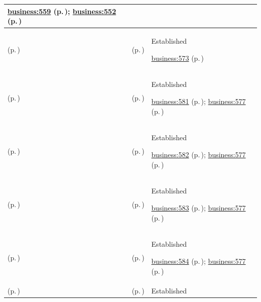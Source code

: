 \begin{longtable}{|>{\raggedright\arraybackslash}p{0.27\TableWidth}|>{\raggedright\arraybackslash}p{0.27\TableWidth}|>{\raggedright\arraybackslash}p{0.46\TableWidth}|}
 \hyperref[rad:business:554]{business:559} (p.\,\pageref{rad:business:554}); \hyperref[rad:business:552]{business:552} (p.\,\pageref{rad:business:552})\\\hline
\nameref{cap:bc-community-health-wellbeing} (p.\,\pageref{cap:bc-community-health-wellbeing}) & \nameref{cap:bc-preventative-health} (p.\,\pageref{cap:bc-preventative-health}) & Established

 \hyperref[rad:business:573]{business:573} (p.\,\pageref{rad:business:573})\\\hline
\nameref{cap:bc-preventative-health} (p.\,\pageref{cap:bc-preventative-health}) & \nameref{cap:bc-preventative-health-problem-identification} (p.\,\pageref{cap:bc-preventative-health-problem-identification}) & Established

 \hyperref[rad:business:579]{business:581} (p.\,\pageref{rad:business:579}); \hyperref[rad:business:577]{business:577} (p.\,\pageref{rad:business:577})\\\hline
\nameref{cap:bc-preventative-health} (p.\,\pageref{cap:bc-preventative-health}) & \nameref{cap:bc-preventative-health-programme-management} (p.\,\pageref{cap:bc-preventative-health-programme-management}) & Established

 \hyperref[rad:business:579]{business:582} (p.\,\pageref{rad:business:579}); \hyperref[rad:business:577]{business:577} (p.\,\pageref{rad:business:577})\\\hline
\nameref{cap:bc-preventative-health} (p.\,\pageref{cap:bc-preventative-health}) & \nameref{cap:bc-preventative-health-education-services} (p.\,\pageref{cap:bc-preventative-health-education-services}) & Established

 \hyperref[rad:business:579]{business:583} (p.\,\pageref{rad:business:579}); \hyperref[rad:business:577]{business:577} (p.\,\pageref{rad:business:577})\\\hline
\nameref{cap:bc-preventative-health} (p.\,\pageref{cap:bc-preventative-health}) & \nameref{cap:bc-preventative-health-programme-monitoring} (p.\,\pageref{cap:bc-preventative-health-programme-monitoring}) & Established

 \hyperref[rad:business:579]{business:584} (p.\,\pageref{rad:business:579}); \hyperref[rad:business:577]{business:577} (p.\,\pageref{rad:business:577})\\\hline
\nameref{cap:bc-preventative-health} (p.\,\pageref{cap:bc-preventative-health}) & \nameref{cap:bc-preventative-health-reporting} (p.\,\pageref{cap:bc-preventative-health-reporting}) & Established


\end{longtable}
